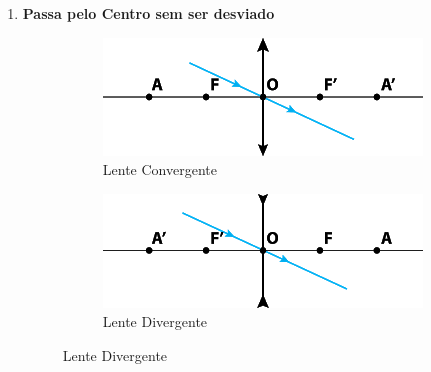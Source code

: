\documentclass[12pt]{extarticle}
\newcommand{\<}{\langle}
\renewcommand{\>}{\rangle}
\theoremstyle{definition}
\begin{document}
\begin{enumerate}
    \item \textbf{Passa pelo Centro sem ser desviado}
    \begin{figure}[H]
        \centering
        \begin{subfigure}[b]{0.45\textwidth}
         \centering
         \includegraphics[width=\textwidth]{notaveis_conv_3.png}
         \caption{Lente Convergente}
         \label{fig:raios_conv_3}
     \end{subfigure}
     \hfill
     \begin{subfigure}[b]{0.45\textwidth}
         \centering
         \includegraphics[width=\textwidth]{notaveis_div_3.png}
         \caption{Lente Divergente}
         \label{fig:raios_div_3}
     \end{subfigure}
    \end{figure}
    

\end{enumerate}
\end{document}
